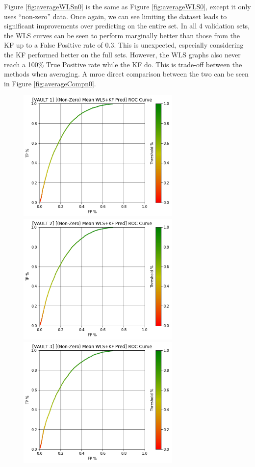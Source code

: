 Figure \ref{fig:averageWLSn0} is the same as Figure \ref{fig:averageWLS0}, except it only uses ``non-zero'' data. Once again, we can see limiting the dataset leads to significant improvements over predicting on the entire set. In all 4 validation sets, the WLS curves can be seen to perform marginally better than those from the KF up to a False Positive rate of 0.3. This is unexpected, especially considering the KF performed better on the full sets. However, the WLS graphs also never reach a 100\% True Positive rate while the KF do. This is trade-off between the methods when averaging. A mroe direct comparison between the two can be seen in Figure \ref{fig:averageCompn0}.

\pagebreak

\begin{figure}[h]
\centering
\includegraphics[width=8cm]{body/results/Graphs/JustSeries/1.PerformaceofMean/4.Combine/Non-Zero/v1.png}
\includegraphics[width=8cm]{body/results/Graphs/JustSeries/1.PerformaceofMean/4.Combine/Non-Zero/v2.png}
\includegraphics[width=8cm]{body/results/Graphs/JustSeries/1.PerformaceofMean/4.Combine/Non-Zero/v3.png}

\end{figure}
